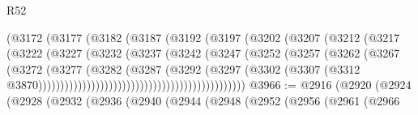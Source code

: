 \begin{lexlean}{R52}
\begin{coremodule}
                                        (@3172
                                          (@3177
                                            (@3182
                                              (@3187
                                                (@3192
                                                  (@3197
                                                    (@3202
                                                      (@3207
                                                        (@3212
                                                          (@3217
                                                            (@3222
                                                              (@3227
                                                                (@3232
                                                                  (@3237
                                                                    (@3242
                                                                      (@3247
                                                                        (@3252
                                                                          (@3257
                                                                            (@3262
                                                                              (@3267
                                                                                (@3272
                                                                                  (@3277
                                                                                    (@3282
                                                                                      (@3287
                                                                                        (@3292
                                                                                          (@3297
                                                                                            (@3302
                                                                                              (@3307
                                                                                                (@3312
                                                                                                  @3870)))))))))))))))))))))))))))))))))))))))))))))))
@3966 := @2916
    (@2920
      (@2924
        (@2928
          (@2932
            (@2936
              (@2940
                (@2944
                  (@2948
                    (@2952
                      (@2956
                        (@2961
                          (@2966

\end{coremodule}
\end{lexlean}
